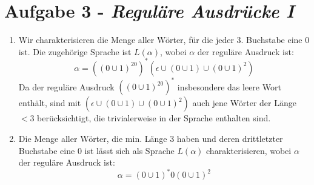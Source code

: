 \documentclass{article}
\begin{document}
	\section*{Aufgabe 3 - \textit{Reguläre Ausdrücke I}}
	\begin{enumerate}
		\item Wir charakterisieren die Menge aller Wörter, für die jeder 3. Buchstabe eine 0 ist. Die zugehörige Sprache ist $L(\alpha)$, wobei $\alpha$ der reguläre Ausdruck ist:
		\begin{equation}
		\alpha = ((0 \cup 1)^20)^* (\epsilon \cup (0 \cup 1) \cup (0 \cup 1 )^2)
		\end{equation}
		Da der reguläre Ausdruck $((0 \cup 1)^20)^*$ insbesondere das leere Wort enthält, sind mit $(\epsilon \cup (0 \cup 1) \cup (0 \cup 1 )^2)$ auch jene Wörter der Länge $<3$ berücksichtigt, die trivialerweise in der Sprache enthalten sind.
		
		\item Die Menge aller Wörter, die min. Länge 3 haben und deren drittletzter Buchstabe eine 0 ist lässt sich als Sprache $L(\alpha)$ charakterisieren, wobei $\alpha$ der reguläre Ausdruck ist:
		\begin{equation}
		\alpha = (0 \cup 1)^*0(0 \cup 1)^2
		\end{equation}
		
		
	\end{enumerate}
	
\end{document}
